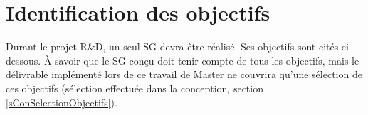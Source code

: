 \begin{itemize}
\begin{itemize}
			\begin{minipage}{\linewidth}
				\label{PicsWalk}
			\end{minipage}\medskip
		\end{itemize}		
	\end{itemize}

\section{Identification des objectifs}
	\label{sAnaDescriptionObjectifsCTI}
	Durant le projet R\&D, un seul SG devra être réalisé. Ses objectifs sont cités ci-dessous. À savoir que le SG conçu doit tenir compte de tous les objectifs, mais le délivrable implémenté lors de ce travail de Master ne couvrira qu'une sélection de ces objectifs (sélection effectuée dans la conception, section \ref{sConSelectionObjectifs}).
	

